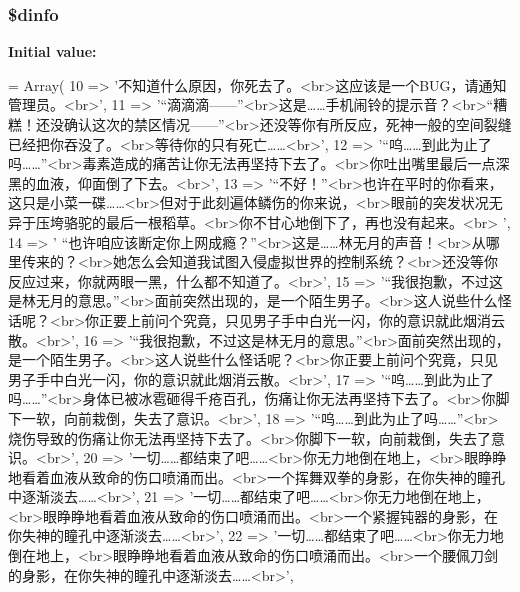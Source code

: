 \hypertarget{resources__1_8php_a9640d994c06710b77fc93ddf4f99f50f}{
\subsubsection[{\$dinfo}]{\setlength{\rightskip}{0pt plus 5cm}\$dinfo}}\label{resources__1_8php_a9640d994c06710b77fc93ddf4f99f50f}
{\bfseries Initial value\+:}
\begin{DoxyCode}
= Array(
    10 => \textcolor{stringliteral}{'不知道什么原因，你死去了。<br>这应该是一个BUG，请通知管理员。<br>'},
    11 => \textcolor{stringliteral}{'“滴滴滴——”<br>这是……手机闹铃的提示音？<br>“糟糕！还没确认这次的禁区情况——”<br>还没等你有所反应，死神一般的空间裂缝已经把你吞没了。<br>等待你的只有死亡……<br>'},
    12 => \textcolor{stringliteral}{'“呜……到此为止了吗……”<br>毒素造成的痛苦让你无法再坚持下去了。<br>你吐出嘴里最后一点深黑的血液，仰面倒了下去。<br>'},
    13 => \textcolor{stringliteral}{'“不好！”<br>也许在平时的你看来，这只是小菜一碟……<br>但对于此刻遍体鳞伤的你来说，<br>眼前的突发状况无异于压垮骆驼的最后一根稻草。<br>你不甘心地倒下了，再也没有起来。<br>
      '},
    14 => \textcolor{stringliteral}{'
      “也许咱应该断定你上网成瘾？”<br>这是……林无月的声音！<br>从哪里传来的？<br>她怎么会知道我试图入侵虚拟世界的控制系统？<br>还没等你反应过来，你就两眼一黑，什么都不知道了。<br>'},
    15 => \textcolor{stringliteral}{'“我很抱歉，不过这是林无月的意思。”<br>面前突然出现的，是一个陌生男子。<br>这人说些什么怪话呢？<br>你正要上前问个究竟，只见男子手中白光一闪，你的意识就此烟消云散。<br>'},
    16 => \textcolor{stringliteral}{'“我很抱歉，不过这是林无月的意思。”<br>面前突然出现的，是一个陌生男子。<br>这人说些什么怪话呢？<br>你正要上前问个究竟，只见男子手中白光一闪，你的意识就此烟消云散。<br>'},
    17 => \textcolor{stringliteral}{'“呜……到此为止了吗……”<br>身体已被冰雹砸得千疮百孔，伤痛让你无法再坚持下去了。<br>你脚下一软，向前栽倒，失去了意识。<br>'},
    18 => \textcolor{stringliteral}{'“呜……到此为止了吗……”<br>烧伤导致的伤痛让你无法再坚持下去了。<br>你脚下一软，向前栽倒，失去了意识。<br>'},
    20 => \textcolor{stringliteral}{'一切……都结束了吧……<br>你无力地倒在地上，<br>眼睁睁地看着血液从致命的伤口喷涌而出。<br>一个挥舞双拳的身影，在你失神的瞳孔中逐渐淡去……<br>'},
    21 => \textcolor{stringliteral}{'一切……都结束了吧……<br>你无力地倒在地上，<br>眼睁睁地看着血液从致命的伤口喷涌而出。<br>一个紧握钝器的身影，在你失神的瞳孔中逐渐淡去……<br>'},
    22 => \textcolor{stringliteral}{'一切……都结束了吧……<br>你无力地倒在地上，<br>眼睁睁地看着血液从致命的伤口喷涌而出。<br>一个腰佩刀剑的身影，在你失神的瞳孔中逐渐淡去……<br>'},

\end{DoxyCode}
